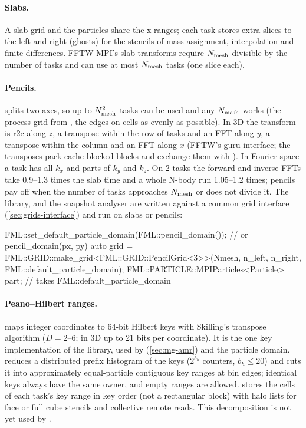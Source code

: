 \paragraph*{Slabs.} A slab grid and the particles share the x-ranges; each task stores extra slices to the left and right
(ghosts) for the stencils of mass assignment, interpolation and finite differences. FFTW-MPI's slab transforms require
$N_{\rm mesh}$ divisible by the number of tasks and can use at most $N_{\rm mesh}$ tasks (one slice each).

\paragraph*{Pencils.}  splits two axes, so up to $N_{\rm mesh}^2$ tasks can be used and any $N_{\rm mesh}$ works
(the process grid from , the edges on cells as evenly as possible). In 3D the transform is r2c along
$z$, a transpose within the row of tasks and an FFT along $y$, a transpose within the column and an FFT along $x$ (FFTW's
guru interface; the transposes pack cache-blocked blocks and exchange them with ). In Fourier space a
task has all $k_x$ and parts of $k_y$ and $k_z$. On 2 tasks the forward and inverse FFTs take 0.9--1.3 times the slab time
and a whole N-body run 1.05--1.2 times; pencils pay off when the number of tasks approaches $N_{\rm mesh}$ or does not divide
it. The library,  and the snapshot analyser are written against a common grid interface
(\cref{sec:grids-interface}) and run on slabs or pencils:

\begin{cppcode}
FML::set_default_particle_domain(FML::pencil_domain());          // or pencil_domain(px, py)
auto grid = FML::GRID::make_grid<FML::GRID::PencilGrid<3>>(Nmesh, n_left, n_right, FML::default_particle_domain);
FML::PARTICLE::MPIParticles<Particle> part;     // takes FML::default_particle_domain
\end{cppcode}

\paragraph*{Peano--Hilbert ranges.}  maps integer coordinates to 64-bit Hilbert keys with Skilling's
transpose algorithm \cite{Skilling2004} ($D=2$--6; in 3D up to 21 bits per coordinate). It is the one key implementation
of the library, used by  (\cref{sec:mg-amr}) and the particle domain. 
reduces a distributed prefix histogram of the keys ($2^{b_h}$ counters, $b_h\le20$) and cuts it into approximately
equal-particle contiguous key ranges at bin edges; identical keys always have the same owner, and empty ranges are allowed.
 stores the cells of each task's key range in key order (not a rectangular block) with halo lists for
face or full cube stencils and collective remote reads. This decomposition is not yet used by .

